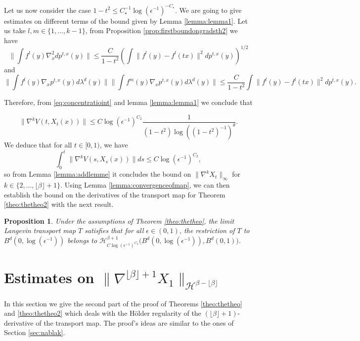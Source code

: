 \documentclass{article}
\newtheorem{proposition}{Proposition}
\begin{document}
Let us now consider the case $1-t^2\leq C^{-1}_\star\log(\epsilon^{-1})^{-C_\star}$. We are going to give estimates on different terms of the bound given by Lemma \ref{lemma:lemma1}. Let us take $l,m\in \{1,...,k-1\}$, from Proposition \ref{prop:firstboundongradsth2} we have  
$$ \|\int f^{l}(y)\nabla^2_x dp^{t,x}(y) \|
    \leq \frac{C}{1-t^2} \left(\int \|f^l(y)-f^l(tx)\|^2dp^{t,x}(y)\right)^{1/2}$$
    and 
$$ \|\int f^{l}(y)\nabla_x p^{t,x}(y)d\lambda^d(y)\| \|\int f^{m}(y)\nabla_x p^{t,x}(y)d\lambda^d(y) \|
    \leq \frac{C}{1-t^2} \int \|f^l(y)-f^l(tx)\|^2dp^{t,x}(y).$$

Therefore, from \eqref{eq:concentratioint} and lemma \ref{lemma:lemma1} we conclude that     

\begin{equation}
     \|\nabla^{k} V(t,X_t(x))\|\leq  C\log(\epsilon^{-1})^{C_2}\frac{1}{(1-t^2)\log((1-t^2)^{-1})^\theta}.
\end{equation}
We deduce that for all $t\in [0,1)$,
we have 
$$\int_0^t\|\nabla^{k} V(s,X_s(x))\|ds\leq  C\log(\epsilon^{-1})^{C_2},$$
so from Lemma \ref{lemma:addlemme} it concludes the bound on $\|\nabla^k X_t\|_\infty$ for $k\in\{2,...,\lfloor \beta \rfloor +1\}$. Using Lemma \ref{lemma:convergenceofmap}, we can then establish the bound on the derivatives of the transport map for Theorem \ref{theo:thetheo2} with the next result.

\begin{proposition}
    Under the assumptions of Theorem \ref{theo:thetheo}, the limit Langevin transport map $T$ satisfies that for all $\epsilon\in (0,1)$, the restriction of $T$ to $B^d(0,\log(\epsilon^{-1}))$ belongs to $ \mathcal{H}_{C\log(\epsilon^{-1})^{C_2}}^{\beta+1}\Big(B^d(0,\log(\epsilon^{-1})),B^d(0,1)\Big)$.
\end{proposition}
















 


\section{Estimates on  $\|\nabla^{\lfloor \beta \rfloor+1} X_1\|_{\mathcal{H}^{\beta-\lfloor \beta \rfloor}}$}\label{sec:holdregulastderiv}
In this section we give the second part of the proof of Theorems \ref{theo:thetheo} and \ref{theo:thetheo2} which deals with the Hölder regularity of the $(\lfloor \beta \rfloor+1)$-derivative of the transport map. The proof's ideas are similar to the ones of Section \ref{sec:nablak}.
\end{document}
